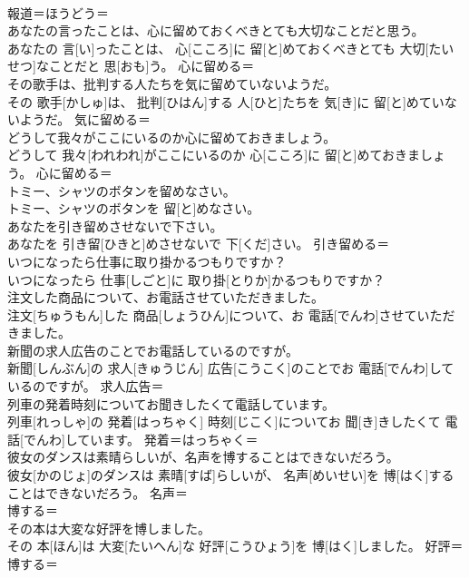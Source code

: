 \documentclass[8pt]{extreport}
\begin{document}
\begin{CJK}{UTF8}{min}
\\	報道＝ほうどう＝ 
\\	あなたの言ったことは、心に留めておくべきとても大切なことだと思う。	
\\	あなたの 言[い]ったことは、 心[こころ]に 留[と]めておくべきとても 大切[たいせつ]なことだと 思[おも]う。	心に留める＝ 
\\	その歌手は、批判する人たちを気に留めていないようだ。	
\\	その 歌手[かしゅ]は、 批判[ひはん]する 人[ひと]たちを 気[き]に 留[と]めていないようだ。	気に留める＝ 
\\	どうして我々がここにいるのか心に留めておきましょう。	
\\	どうして 我々[われわれ]がここにいるのか 心[こころ]に 留[と]めておきましょう。	心に留める＝ 
\\	トミー、シャツのボタンを留めなさい。	
\\	トミー、シャツのボタンを 留[と]めなさい。	
\\	あなたを引き留めさせないで下さい。	
\\	あなたを 引き留[ひきと]めさせないで 下[くだ]さい。	引き留める＝ 
\\	いつになったら仕事に取り掛かるつもりですか？	
\\	いつになったら 仕事[しごと]に 取り掛[とりか]かるつもりですか？	
\\	注文した商品について、お電話させていただきました。	
\\	注文[ちゅうもん]した 商品[しょうひん]について、お 電話[でんわ]させていただきました。	
\\	新聞の求人広告のことでお電話しているのですが。	
\\	新聞[しんぶん]の 求人[きゅうじん] 広告[こうこく]のことでお 電話[でんわ]しているのですが。	求人広告＝ 
\\	列車の発着時刻についてお聞きしたくて電話しています。	
\\	列車[れっしゃ]の 発着[はっちゃく] 時刻[じこく]についてお 聞[き]きしたくて 電話[でんわ]しています。	発着＝はっちゃく＝ 
\\	彼女のダンスは素晴らしいが、名声を博することはできないだろう。	
\\	彼女[かのじょ]のダンスは 素晴[すば]らしいが、 名声[めいせい]を 博[はく]することはできないだろう。	名声＝ 
\\	博する＝ 
\\	その本は大変な好評を博しました。	
\\	その 本[ほん]は 大変[たいへん]な 好評[こうひょう]を 博[はく]しました。	好評＝ 
\\	博する＝ 

\end{CJK}
\end{document}
